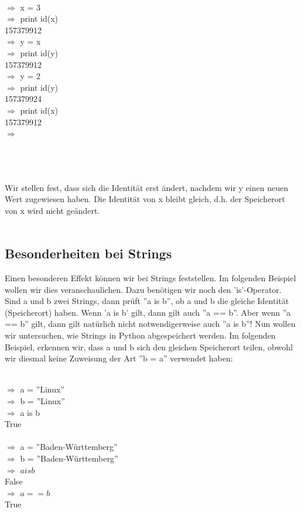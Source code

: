 \\
\begin{MyConsoleBox}{
${\Longrightarrow}$ x = 3 \\
${\Longrightarrow}$ print id(x) \\
157379912 \\
${\Longrightarrow}$ y = x \\
${\Longrightarrow}$ print id(y) \\
157379912 \\
${\Longrightarrow}$ y = 2 \\
${\Longrightarrow}$ print id(y) \\
157379924 \\
${\Longrightarrow}$ print id(x) \\
157379912 \\
${\Longrightarrow}$ \\
}\end{MyConsoleBox}
\\ \\ \\
Wir stellen fest, dass sich die Identität erst ändert, nachdem wir y einen neuen Wert zugewiesen haben. Die Identität von x bleibt gleich, d.h. der Speicherort von x wird nicht geändert. \\
\\

\subsection{Besonderheiten bei Strings}
Einen besonderen Effekt können wir bei Strings feststellen. Im folgenden Beispiel wollen wir dies veranschaulichen. Dazu benötigen wir noch den 'is'-Operator. Sind a und b zwei Strings, dann prüft ''a is b'', ob a und b die gleiche Identität (Speicherort) haben. Wenn 'a is b' gilt, dann gilt auch ''a == b''. Aber wenn ''a == b'' gilt, dann gilt natürlich nicht notwendigerweise auch ''a is b''!
Nun wollen wir untersuchen, wie Strings in Python abgespeichert werden. Im folgenden Beispiel, erkennen wir, dass a und b sich den gleichen Speicherort teilen, obwohl wir diesmal keine Zuweisung der Art ''b = a'' verwendet haben: \\
\\
\begin{MyConsoleBox}{
${\Longrightarrow}$ a = ''Linux'' \\
${\Longrightarrow}$ b = ''Linux'' \\
${\Longrightarrow}$ a is b \\
True \\
\\
${\Longrightarrow}$ a = ''Baden-Württemberg'' \\
${\Longrightarrow}$ b = ''Baden-Württemberg'' \\
${\Longrightarrow}$ $a is b$ \\
False \\
${\Longrightarrow}$ $a == b$ \\
True \\
}\end{MyConsoleBox}
\\

